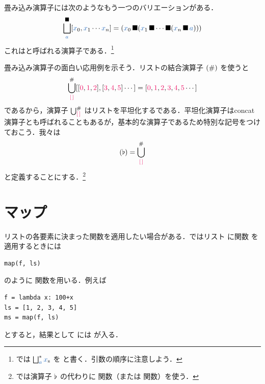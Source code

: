 \documentclass[a5paper,twoside,fleqn,draft]{jsbook}
\begin{document}
\separator

畳み込み演算子には次のようなもう一つのバリエーションがある．
\begin{equation}
  \hFoldRight^{\hAnyBinOp}_{\hVar{a}}[\hVar{x}_0,\hVar{x}_1\dotsb \hVar{x}_n]
  =(\hVar{x}_0\hAnyBinOp(\hVar{x}_1\hAnyBinOp\dotsb\hAnyBinOp(\hVar{x}_n\hAnyBinOp\hVar{a})))
\end{equation}
これはと呼ばれる演算子である．\footnote{\haskell では $\hFoldRight^{*}_{\hVar{a}}\hListVar{x}$ を  と書く．引数の順序に注意しよう．}

\separator

畳み込み演算子の面白い応用例を示そう．リストの結合演算子 $(\operatorname{\#})$ を使うと
\begin{equation}
  \hFold_{\hEmptyList}^{\hAppend}[[\hConstant{0},\hConstant{1},\hConstant{2}],[\hConstant{3},\hConstant{4},\hConstant{5}]\dotsb]
  =[\hConstant{0},\hConstant{1},\hConstant{2},\hConstant{3},\hConstant{4},\hConstant{5}\dotsb]
\end{equation}
であるから，演算子 $\hFold_{\hEmptyList}^{\hAppend}$ はリストを平坦化するである．平坦化演算子はconcat演算子とも呼ばれることもあるが，基本的な演算子であるため特別な記号をつけておこう．我々は
\begin{equation}
  (\hJoinList)
  =\hFold_{\hEmptyList}^{\hAppend}
\end{equation}
と定義することにする．\footnote{\haskell では演算子 $\operatorname{\flat}$ の代わりに  関数（または  関数）を使う．}

\section{マップ}

リストの各要素に決まった関数を適用したい場合がある．\python ではリスト  に関数  を適用するときには
\begin{pythoncode}
\begin{verbatim}
map(f, ls)
\end{verbatim}
\end{pythoncode}
のように  関数を用いる．例えば
\begin{pythoncode}
\begin{verbatim}
f = lambda x: 100+x
ls = [1, 2, 3, 4, 5]
ms = map(f, ls)
\end{verbatim}
\end{pythoncode}
とすると，結果として  には \code{[101, 102, 103, 104, 105]} が入る．
\end{document}
